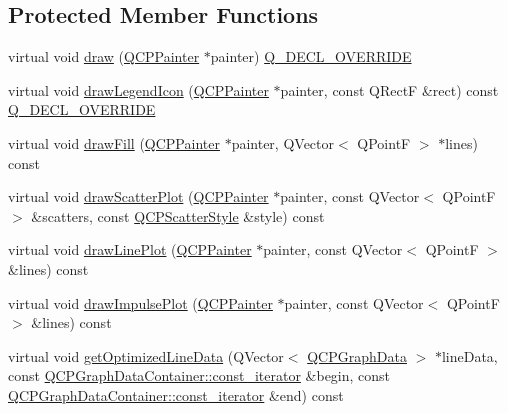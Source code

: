 \subsection*{Protected Member Functions}
\begin{DoxyCompactItemize}
\item 
virtual void \hyperlink{class_q_c_p_graph_a2b0849598f06e834b43ce18cd13bcdc3}{draw} (\hyperlink{class_q_c_p_painter}{Q\+C\+P\+Painter} $\ast$painter) \hyperlink{qcustomplot_8h_a42cc5eaeb25b85f8b52d2a4b94c56f55}{Q\+\_\+\+D\+E\+C\+L\+\_\+\+O\+V\+E\+R\+R\+I\+DE}
\item 
virtual void \hyperlink{class_q_c_p_graph_a6efbab06c400bdb15e28b2d0a4ecc18a}{draw\+Legend\+Icon} (\hyperlink{class_q_c_p_painter}{Q\+C\+P\+Painter} $\ast$painter, const Q\+RectF \&rect) const \hyperlink{qcustomplot_8h_a42cc5eaeb25b85f8b52d2a4b94c56f55}{Q\+\_\+\+D\+E\+C\+L\+\_\+\+O\+V\+E\+R\+R\+I\+DE}
\item 
virtual void \hyperlink{class_q_c_p_graph_a67c5ea573f604efd8bf121a0b7a380d1}{draw\+Fill} (\hyperlink{class_q_c_p_painter}{Q\+C\+P\+Painter} $\ast$painter, Q\+Vector$<$ Q\+PointF $>$ $\ast$lines) const
\item 
virtual void \hyperlink{class_q_c_p_graph_abeb0bbe81026c024bf3d508d13cf5e0e}{draw\+Scatter\+Plot} (\hyperlink{class_q_c_p_painter}{Q\+C\+P\+Painter} $\ast$painter, const Q\+Vector$<$ Q\+PointF $>$ \&scatters, const \hyperlink{class_q_c_p_scatter_style}{Q\+C\+P\+Scatter\+Style} \&style) const
\item 
virtual void \hyperlink{class_q_c_p_graph_a4c3edacb2a11064bf2e16b322156aeda}{draw\+Line\+Plot} (\hyperlink{class_q_c_p_painter}{Q\+C\+P\+Painter} $\ast$painter, const Q\+Vector$<$ Q\+PointF $>$ \&lines) const
\item 
virtual void \hyperlink{class_q_c_p_graph_a217ef6bf6c5689eb1dcbe02187d2cc61}{draw\+Impulse\+Plot} (\hyperlink{class_q_c_p_painter}{Q\+C\+P\+Painter} $\ast$painter, const Q\+Vector$<$ Q\+PointF $>$ \&lines) const
\item 
virtual void \hyperlink{class_q_c_p_graph_a1fed1c9d627d9d3b49a6206cc2e60fe1}{get\+Optimized\+Line\+Data} (Q\+Vector$<$ \hyperlink{class_q_c_p_graph_data}{Q\+C\+P\+Graph\+Data} $>$ $\ast$line\+Data, const \hyperlink{class_q_c_p_data_container_ae40a91f5cb0bcac61d727427449b7d15}{Q\+C\+P\+Graph\+Data\+Container\+::const\+\_\+iterator} \&begin, const \hyperlink{class_q_c_p_data_container_ae40a91f5cb0bcac61d727427449b7d15}{Q\+C\+P\+Graph\+Data\+Container\+::const\+\_\+iterator} \&end) const
\item 

\end{DoxyCompactItemize}
